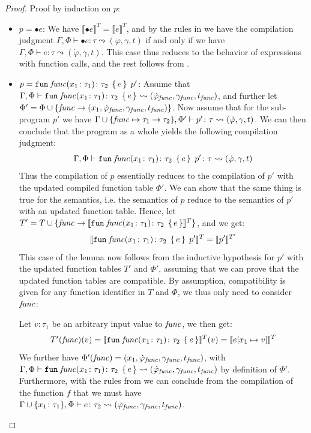 \begin{proof}
	Proof by induction on $p$:
	\begin{itemize}
		\item $p = \bullet e$: 
		We have $\llbracket \bullet e\rrbracket^T = \llbracket e\rrbracket^T$, and by the rules in  we have the compilation judgment $\Gamma, \Phi \vdash \bullet e  \colon \tau \leadsto (\dot{\varphi}, \gamma, t)$ if and only if we have $\Gamma, \Phi \vdash e \colon \tau \leadsto (\dot{\varphi}, \gamma, t)$. 
		This case thus reduces to the behavior of expressions with function calls, and the rest follows from .\\
		
		\item $p = \texttt{fun} \; \mathit{func} (x_1 \colon \tau_1) \colon \tau_2 \; \left\{\, e \,\right\} \; p'$: 
		Assume that $\Gamma, \Phi \vdash \texttt{fun} \; \mathit{func} (x_1 \colon \tau_1) \colon \tau_2 \; \left\{\, e \,\right\}  \leadsto (\dot{\varphi}_{\mathit{func}}, \gamma_{\mathit{func}}, t_{\mathit{func}})$, and further let $\Phi' = \Phi \cup \{\mathit{func} \rightarrow (x_1, \dot{\varphi}_{\mathit{func}}, \gamma_{\mathit{func}}, t_{\mathit{func}})\}$. 
		Now assume that for the sub-program $p'$ we have $\Gamma\cup \{\mathit{func} \mapsto \tau_1 \rightarrow \tau_2\}, \Phi' \vdash  p' \colon \tau \leadsto (\dot{\varphi}, \gamma, t)$. 
		We can then conclude that the program as a whole yields the following compilation judgment:
		$$\Gamma, \Phi \vdash  \texttt{fun} \; \mathit{func} (x_1 \colon \tau_1) \colon \tau_2 \; \left\{\, e \,\right\} \; p' \colon \tau \leadsto (\dot{\varphi}, \gamma, t)$$
		Thus the compilation of $p$ essentially reduces to the compilation of $p'$ with the updated compiled function table $\Phi'$. 
		We can show that the same thing is true for the semantics, i.e. the semantics of $p$ reduce to the semantics of $p'$ with an updated function table.
		Hence, let $T' = T \cup \{\mathit{func} \rightarrow \llbracket \texttt{fun} \; \mathit{func} (x_1 \colon \tau_1) \colon \tau_2 \; \left\{\, e \,\right\}  \rrbracket^T\}$, and we get:
		$$\llbracket \texttt{fun} \; \mathit{func} (x_1 \colon \tau_1) \colon \tau_2 \; \left\{\, e \,\right\} \; p' \rrbracket^T = \llbracket p' \rrbracket^{T'}$$
		This case of the lemma now follows from the inductive hypothesis for $p'$ with the updated function tables $T'$ and $\Phi'$, assuming that we can prove that the updated function tables are compatible. 
		By assumption, compatibility is given for any function identifier in $T$ and $\Phi$, we thus only need to consider $\mathit{func}$:
		
		Let $v\colon \tau_1$ be an arbitrary input value to $\mathit{func}$, we then get:
		$$T'(\mathit{func})(v) = \llbracket \texttt{fun} \; \mathit{func} (x_1 \colon \tau_1) \colon \tau_2 \; \left\{\, e \,\right\}  \rrbracket^T(v) = \llbracket e[x_1\mapsto v]\rrbracket^T$$
		We further have $\Phi'(\mathit{func}) = (x_1, \dot{\varphi}_{\mathit{func}}, \gamma_{\mathit{func}}, t_{\mathit{func}})$, with $\Gamma, \Phi \vdash \texttt{fun} \; \mathit{func} (x_1 \colon \tau_1) \colon \tau_2 \; \left\{\, e \,\right\}  \leadsto (\dot{\varphi}_{\mathit{func}}, \gamma_{\mathit{func}}, t_{\mathit{func}})$ by definition of $\Phi'$. 
		Furthermore, with the rules from  we can conclude from the compilation of the function $f$ that we must have $\Gamma\cup\{x_1 \colon \tau_1\}, \Phi \vdash e \colon \tau_2 \leadsto (\dot{\varphi}_{\mathit{func}}, \gamma_{\mathit{func}}, t_{\mathit{func}})$.
		

\end{itemize}
\end{proof}

